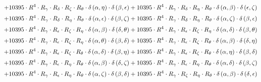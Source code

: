 \begin{subequations}
\begin{gather}
 \\[0.2em] \notag 		 + 10395 \cdot R^{4} \cdot R_{\gamma{}} \cdot R_{\delta{}} \cdot R_{\zeta{}} \cdot R_{\theta{}} \cdot \delta{}\left(\alpha{}, \eta{}\right) \cdot \delta{}\left(\beta{}, \epsilon{}\right)+ 10395 \cdot R^{4} \cdot R_{\gamma{}} \cdot R_{\delta{}} \cdot R_{\eta{}} \cdot R_{\theta{}} \cdot \delta{}\left(\alpha{}, \beta{}\right) \cdot \delta{}\left(\epsilon{}, \zeta{}\right) 
 \\[0.2em] \notag 		 + 10395 \cdot R^{4} \cdot R_{\gamma{}} \cdot R_{\delta{}} \cdot R_{\eta{}} \cdot R_{\theta{}} \cdot \delta{}\left(\alpha{}, \epsilon{}\right) \cdot \delta{}\left(\beta{}, \zeta{}\right)+ 10395 \cdot R^{4} \cdot R_{\gamma{}} \cdot R_{\delta{}} \cdot R_{\eta{}} \cdot R_{\theta{}} \cdot \delta{}\left(\alpha{}, \zeta{}\right) \cdot \delta{}\left(\beta{}, \epsilon{}\right) 
 \\[0.2em] \notag 		 + 10395 \cdot R^{4} \cdot R_{\gamma{}} \cdot R_{\epsilon{}} \cdot R_{\zeta{}} \cdot R_{\eta{}} \cdot \delta{}\left(\alpha{}, \beta{}\right) \cdot \delta{}\left(\delta{}, \theta{}\right)+ 10395 \cdot R^{4} \cdot R_{\gamma{}} \cdot R_{\epsilon{}} \cdot R_{\zeta{}} \cdot R_{\eta{}} \cdot \delta{}\left(\alpha{}, \delta{}\right) \cdot \delta{}\left(\beta{}, \theta{}\right) 
 \\[0.2em] \notag 		 + 10395 \cdot R^{4} \cdot R_{\gamma{}} \cdot R_{\epsilon{}} \cdot R_{\zeta{}} \cdot R_{\eta{}} \cdot \delta{}\left(\alpha{}, \theta{}\right) \cdot \delta{}\left(\beta{}, \delta{}\right)+ 10395 \cdot R^{4} \cdot R_{\gamma{}} \cdot R_{\epsilon{}} \cdot R_{\zeta{}} \cdot R_{\theta{}} \cdot \delta{}\left(\alpha{}, \beta{}\right) \cdot \delta{}\left(\delta{}, \eta{}\right) 
 \\[0.2em] \notag 		 + 10395 \cdot R^{4} \cdot R_{\gamma{}} \cdot R_{\epsilon{}} \cdot R_{\zeta{}} \cdot R_{\theta{}} \cdot \delta{}\left(\alpha{}, \delta{}\right) \cdot \delta{}\left(\beta{}, \eta{}\right)+ 10395 \cdot R^{4} \cdot R_{\gamma{}} \cdot R_{\epsilon{}} \cdot R_{\zeta{}} \cdot R_{\theta{}} \cdot \delta{}\left(\alpha{}, \eta{}\right) \cdot \delta{}\left(\beta{}, \delta{}\right) 
 \\[0.2em] \notag 		 + 10395 \cdot R^{4} \cdot R_{\gamma{}} \cdot R_{\epsilon{}} \cdot R_{\eta{}} \cdot R_{\theta{}} \cdot \delta{}\left(\alpha{}, \beta{}\right) \cdot \delta{}\left(\delta{}, \zeta{}\right)+ 10395 \cdot R^{4} \cdot R_{\gamma{}} \cdot R_{\epsilon{}} \cdot R_{\eta{}} \cdot R_{\theta{}} \cdot \delta{}\left(\alpha{}, \delta{}\right) \cdot \delta{}\left(\beta{}, \zeta{}\right) 
 \\[0.2em] \notag 		 + 10395 \cdot R^{4} \cdot R_{\gamma{}} \cdot R_{\epsilon{}} \cdot R_{\eta{}} \cdot R_{\theta{}} \cdot \delta{}\left(\alpha{}, \zeta{}\right) \cdot \delta{}\left(\beta{}, \delta{}\right)+ 10395 \cdot R^{4} \cdot R_{\gamma{}} \cdot R_{\zeta{}} \cdot R_{\eta{}} \cdot R_{\theta{}} \cdot \delta{}\left(\alpha{}, \beta{}\right) \cdot \delta{}\left(\delta{}, \epsilon{}\right) 

\end{gather}
\end{subequations}
